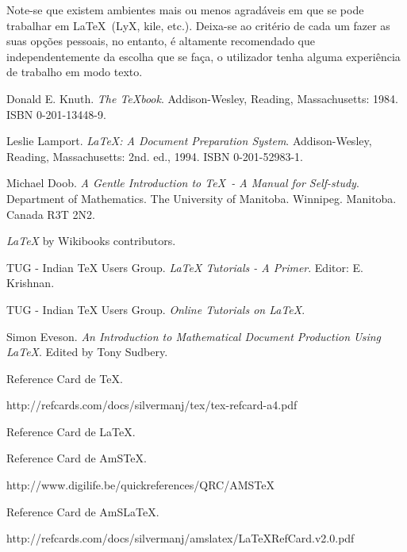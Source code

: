 \documentclass[a4paper,12pt]{article}
\begin{document}
Note-se que existem ambientes mais ou menos agradáveis em que
se pode trabalhar em \LaTeX\ (LyX, kile, etc.). Deixa-se ao critério de cada um fazer
as suas opções pessoais, no entanto, é altamente recomendado que
independentemente da escolha que se faça, o utilizador tenha
alguma experiência de trabalho em modo texto.



\printindex

\begin{thebibliography}{99}

Donald E. Knuth. {\it The TeXbook}.
Addison-Wesley, Reading, Massachusetts: 1984. ISBN 0-201-13448-9.

Leslie Lamport. {\it LaTeX: A Document Preparation System}. 
Addison-Wesley, Reading, Massachusetts: 2nd. ed., 1994. ISBN 0-201-52983-1.

Michael Doob. {\it A Gentle Introduction to \TeX\ - A Manual for Self-study}.
Department of Mathematics. The University of Manitoba. Winnipeg. Manitoba.
Canada R3T 2N2.
\par [http://onlinebooks.library.upenn.edu/webbin/book/lookupname?key=
Doob\%2C Michael]

{\it LaTeX} by Wikibooks contributors.
\par [http://en.wikibooks.org/wiki/LaTeX]

TUG - Indian TeX Users Group.
{\it LaTeX Tutorials - A Primer}. Editor: E. Krishnan.
\par [http://www-h.eng.cam.ac.uk/help/tpl/textprocessing/ltxprimer-1.0.pdf]

TUG - Indian TeX Users Group.
{\it Online Tutorials on LaTeX}.
\par [http://amath.colorado.edu/documentation/LaTeX/tutorial/]

Simon Eveson. 
{\it An Introduction to Mathematical Document Production Using \AmS\LaTeX}.
Edited by Tony Sudbery.
\par [http://www-users.york.ac.uk/~spe1/texnotes07.pdf]

\par [http://authors.aps.org/revtex4/]

Reference Card de TeX.\par
http://refcards.com/docs/silvermanj/tex/tex-refcard-a4.pdf

Reference Card de LaTeX.\par
[http://www.stdout.org/~winston/latex/latexsheet-a4.pdf]

Reference Card de AmSTeX.\par
http://www.digilife.be/quickreferences/QRC/AMSTeX%

Reference Card de AmSLaTeX.\par
http://refcards.com/docs/silvermanj/amslatex/LaTeXRefCard.v2.0.pdf

\end{thebibliography}
\end{document}
